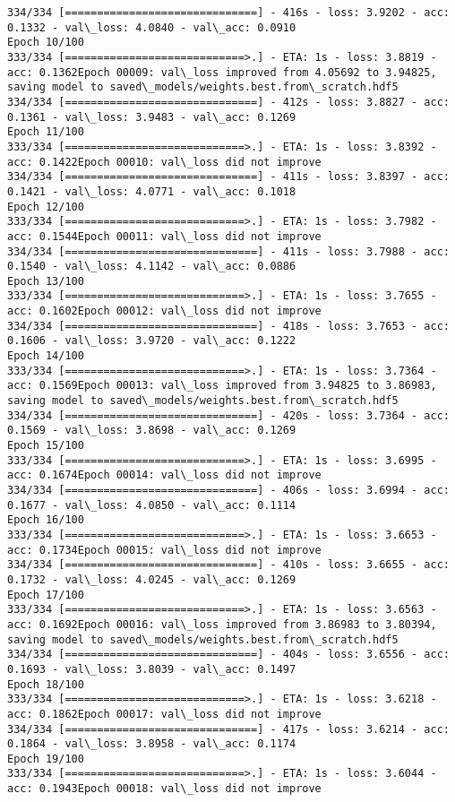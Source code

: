 \documentclass[11pt]{article}
\begin{document}
\begin{Verbatim}[commandchars=\\\{\}]
334/334 [==============================] - 416s - loss: 3.9202 - acc: 0.1332 - val\_loss: 4.0840 - val\_acc: 0.0910
Epoch 10/100
333/334 [============================>.] - ETA: 1s - loss: 3.8819 - acc: 0.1362Epoch 00009: val\_loss improved from 4.05692 to 3.94825, saving model to saved\_models/weights.best.from\_scratch.hdf5
334/334 [==============================] - 412s - loss: 3.8827 - acc: 0.1361 - val\_loss: 3.9483 - val\_acc: 0.1269
Epoch 11/100
333/334 [============================>.] - ETA: 1s - loss: 3.8392 - acc: 0.1422Epoch 00010: val\_loss did not improve
334/334 [==============================] - 411s - loss: 3.8397 - acc: 0.1421 - val\_loss: 4.0771 - val\_acc: 0.1018
Epoch 12/100
333/334 [============================>.] - ETA: 1s - loss: 3.7982 - acc: 0.1544Epoch 00011: val\_loss did not improve
334/334 [==============================] - 411s - loss: 3.7988 - acc: 0.1540 - val\_loss: 4.1142 - val\_acc: 0.0886
Epoch 13/100
333/334 [============================>.] - ETA: 1s - loss: 3.7655 - acc: 0.1602Epoch 00012: val\_loss did not improve
334/334 [==============================] - 418s - loss: 3.7653 - acc: 0.1606 - val\_loss: 3.9720 - val\_acc: 0.1222
Epoch 14/100
333/334 [============================>.] - ETA: 1s - loss: 3.7364 - acc: 0.1569Epoch 00013: val\_loss improved from 3.94825 to 3.86983, saving model to saved\_models/weights.best.from\_scratch.hdf5
334/334 [==============================] - 420s - loss: 3.7364 - acc: 0.1569 - val\_loss: 3.8698 - val\_acc: 0.1269
Epoch 15/100
333/334 [============================>.] - ETA: 1s - loss: 3.6995 - acc: 0.1674Epoch 00014: val\_loss did not improve
334/334 [==============================] - 406s - loss: 3.6994 - acc: 0.1677 - val\_loss: 4.0850 - val\_acc: 0.1114
Epoch 16/100
333/334 [============================>.] - ETA: 1s - loss: 3.6653 - acc: 0.1734Epoch 00015: val\_loss did not improve
334/334 [==============================] - 410s - loss: 3.6655 - acc: 0.1732 - val\_loss: 4.0245 - val\_acc: 0.1269
Epoch 17/100
333/334 [============================>.] - ETA: 1s - loss: 3.6563 - acc: 0.1692Epoch 00016: val\_loss improved from 3.86983 to 3.80394, saving model to saved\_models/weights.best.from\_scratch.hdf5
334/334 [==============================] - 404s - loss: 3.6556 - acc: 0.1693 - val\_loss: 3.8039 - val\_acc: 0.1497
Epoch 18/100
333/334 [============================>.] - ETA: 1s - loss: 3.6218 - acc: 0.1862Epoch 00017: val\_loss did not improve
334/334 [==============================] - 417s - loss: 3.6214 - acc: 0.1864 - val\_loss: 3.8958 - val\_acc: 0.1174
Epoch 19/100
333/334 [============================>.] - ETA: 1s - loss: 3.6044 - acc: 0.1943Epoch 00018: val\_loss did not improve

\end{Verbatim}
\end{document}
